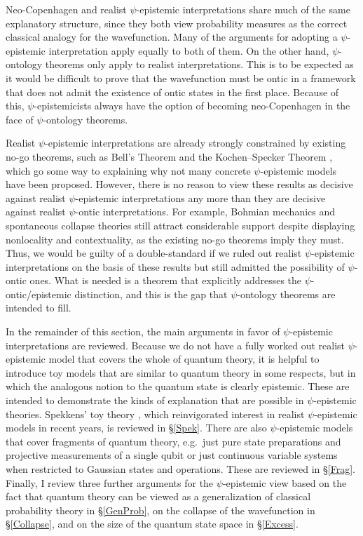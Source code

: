 \documentclass[DIV=calc,fontsize=12pt]{scrartcl} %
\theoremstyle{definition}
\theoremstyle{plain}
\begin{document}
Neo-Copenhagen and realist $\psi$-epistemic interpretations share much
of the same explanatory structure, since they both view probability
measures as the correct classical analogy for the wavefunction.  Many
of the arguments for adopting a $\psi$-epistemic interpretation apply
equally to both of them.  On the other hand, $\psi$-ontology theorems
only apply to realist interpretations.  This is to be expected as it
would be difficult to prove that the wavefunction must be ontic in a
framework that does not admit the existence of ontic states in the
first place.  Because of this, $\psi$-epistemicists always have the
option of becoming neo-Copenhagen in the face of $\psi$-ontology
theorems.

Realist $\psi$-epistemic interpretations are already strongly
constrained by existing no-go theorems, such as Bell's Theorem
\cite{Bell1964} and the Kochen--Specker Theorem \cite{Kochen1967},
which go some way to explaining why not many concrete $\psi$-epistemic
models have been proposed.  However, there is no reason to view these
results as decisive against realist $\psi$-epistemic interpretations
any more than they are decisive against realist $\psi$-ontic
interpretations.  For example, Bohmian mechanics and spontaneous
collapse theories still attract considerable support despite
displaying nonlocality and contextuality, as the existing no-go
theorems imply they must.  Thus, we would be guilty of a
double-standard if we ruled out realist $\psi$-epistemic
interpretations on the basis of these results but still admitted the
possibility of $\psi$-ontic ones.  What is needed is a theorem that
explicitly addresses the $\psi$-ontic/epistemic distinction, and this
is the gap that $\psi$-ontology theorems are intended to fill.

In the remainder of this section, the main arguments in favor of
$\psi$-epistemic interpretations are reviewed.  Because we do not have
a fully worked out realist $\psi$-epistemic model that covers the
whole of quantum theory, it is helpful to introduce toy models that
are similar to quantum theory in some respects, but in which the
analogous notion to the quantum state is clearly epistemic.  These are
intended to demonstrate the kinds of explanation that are possible in
$\psi$-epistemic theories.  Spekkens' toy theory \cite{Spekkens2007},
which reinvigorated interest in realist $\psi$-epistemic models in
recent years, is reviewed in \S\ref{Spek}.  There are also
$\psi$-epistemic models that cover fragments of quantum theory,
e.g.\ just pure state preparations and projective measurements of a
single qubit or just continuous variable systems when restricted to
Gaussian states and operations.  These are reviewed in \S\ref{Frag}.
Finally, I review three further arguments for the $\psi$-epistemic
view based on the fact that quantum theory can be viewed as a
generalization of classical probability theory in \S\ref{GenProb}, on
the collapse of the wavefunction in \S\ref{Collapse}, and on the size
of the quantum state space in \S\ref{Excess}.
\end{document}
